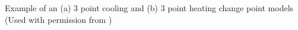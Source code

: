 Example of an (a) 3 point cooling and (b) 3 point heating change point models (Used with permission from \cite{kelly_kissock_measuring_2008})